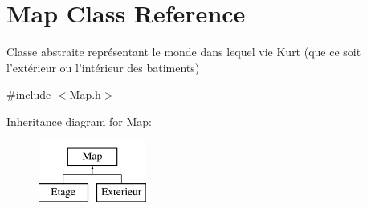 \hypertarget{classMap}{\section{Map Class Reference}
\label{classMap}
}


Classe abstraite représentant le monde dans lequel vie Kurt (que ce soit l'extérieur ou l'intérieur des batiments)  




{\ttfamily \#include $<$Map.\-h$>$}

Inheritance diagram for Map\-:\begin{figure}[H]
\begin{center}
\leavevmode
\includegraphics[height=2.000000cm]{classMap}
\end{center}
\end{figure}
